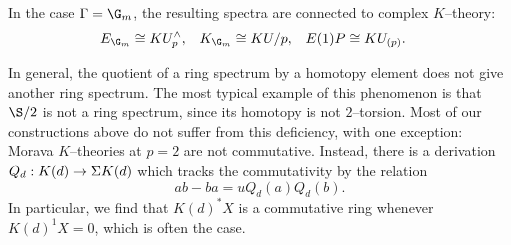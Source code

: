 \begin{example}\label{ExampleOfMoravasTheoriesAtGm}
In the case $\Gamma = \G_m$, the resulting spectra are connected to complex $K$--theory:
\begin{align*}
E_{\G_m} & \cong KU^\wedge_p, &
K_{\G_m} & \cong KU / p, &
E(1)P & \cong KU_{(p)}.
\end{align*}
\end{example}

\begin{remark}\label{MoravaKIsNotCommutative}
In general, the quotient of a ring spectrum by a homotopy element does not give another ring spectrum.  The most typical example of this phenomenon is that $\S/2$ is not a ring spectrum, since its homotopy is not $2$--torsion.  Most of our constructions above do not suffer from this deficiency, with one exception: Morava $K$--theories at $p = 2$ are not commutative.  Instead, there is a derivation $Q_d: K(d) \to \Sigma K(d)$ which tracks the commutativity by the relation \[ab - ba = u Q_d(a) Q_d(b).\]  In particular, we find that $K(d)^* X$ is a commutative ring whenever $K(d)^1 X = 0$, which is often the case.
\end{remark}

